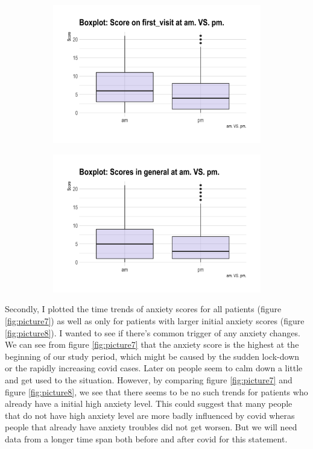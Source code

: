 \documentclass[11pt]{article}
\begin{document}
 \begin{figure}[htb!]
	\caption{Box plots comparing anxiety scores in am. VS. pm.}\label{fig:picture6}
	\begin{subfigure}[h]{0.48\linewidth}
		\includegraphics[width=\linewidth]{Figures/ppp1.png}
		\caption{}\label{fig:ppp1}
	\end{subfigure}
	\hfill
	\begin{subfigure}[h]{0.48\linewidth}
		\includegraphics[width=\linewidth]{Figures/ppp2.png}
		\caption{}\label{fig:ppp2}
	\end{subfigure}
\end{figure}

Secondly, I plotted the time trends of anxiety scores for all patients (figure \ref{fig:picture7}) as well as only for patients with larger initial anxiety scores (figure \ref{fig:picture8}). I wanted to see if there's common trigger of any anxiety changes. We can see from figure \ref{fig:picture7} that the anxiety score is the highest at the beginning of our study period, which might be caused by the sudden lock-down or the rapidly increasing covid cases. Later on people seem to calm down a little and get used to the situation. However, by comparing figure \ref{fig:picture7} and figure \ref{fig:picture8}, we see that there seems to be no such trends for patients who already have a initial high anxiety level. This could suggest that many people that do not have high anxiety level are more badly influenced by covid wheras people that already have anxiety troubles did not get worsen. But we will need data from a longer time span both before and after covid for this statement.
\end{document}
